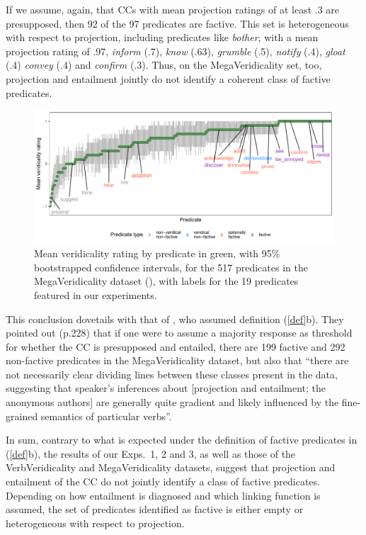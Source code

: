 \documentclass[11pt,fleqn]{article}
\newcommand{\6}{\mbox{$[\hspace*{-.6mm}[$}}
\newcommand{\9}{\mbox{$]\hspace*{-.6mm}]$}}
\begin{document}
If we assume, again, that CCs with mean projection ratings of at least .3 are presupposed, then 92 of the 97 predicates are factive. This set is heterogeneous with respect to projection, including predicates like {\em bother}, with a mean projection rating of .97, {\em inform} (.7), {\em know} (.63), {\em grumble} (.5), {\em notify} (.4), {\em gloat} (.4) {\em convey} (.4) and {\em confirm} (.3). Thus, on the MegaVeridicality set, too, projection and entailment jointly do not identify a coherent class of factive predicates.


\begin{figure}[H]
\centering
\includegraphics[width=.75\paperwidth]{../../MegaVeridicality-analysis/graphs/means-entailment-by-predicate}

\caption{Mean veridicality rating by predicate in green, with 95\% bootstrapped confidence intervals, for the 517 predicates in the MegaVeridicality dataset (\citealt{white-rawlins-nels2018,white-etal2018b}), with labels for the 19 predicates featured in our experiments.}
\label{f-white-rawlins-ent}
\end{figure}
 
 This conclusion dovetails with that of \citet{white-rawlins-nels2018}, who assumed definition (\ref{def}b). They pointed out (p.228) that if one were to assume a majority response as threshold for whether the CC is presupposed and entailed, there are 199 factive and 292 non-factive predicates in the MegaVeridicality dataset, but also that ``there are not necessarily clear dividing lines between these classes present in the data, suggesting that speaker's inferences about [projection and entailment; the anonymous authors] are generally quite gradient and likely influenced by the fine-grained semantics
of particular verbs''.

In sum, contrary to what is expected under the definition of factive predicates in (\ref{def}b), the results of our Exps.~1, 2 and 3, as well as those of the VerbVeridicality and MegaVeridicality datasets, suggest that projection and entailment of the CC do not jointly identify a class of factive predicates. Depending on how entailment is diagnosed and which linking function is assumed, the set of predicates identified as factive is either empty or heterogeneous with respect to projection.
\end{document}
